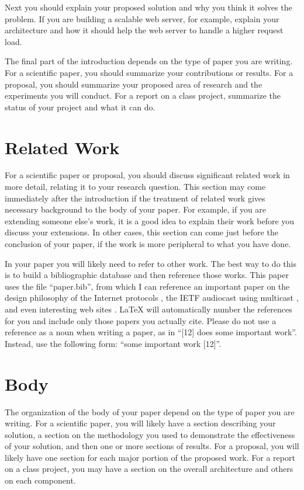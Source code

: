 \documentclass[11pt,onecolumn]{IEEEtran}
\begin{document}
Next you should explain your proposed solution and why you think it
solves the problem.  If you are building a scalable web server, for
example, explain your architecture and how it should help the
web server to handle a higher request load.

The final part of the introduction depends on the type of paper you
are writing.  For a scientific paper, you should summarize your
contributions or results.  For a proposal, you should summarize
your proposed area of research and the experiments you will conduct.
For a report on a class project, summarize the status of your project
and what it can do.

\section{Related Work}

For a scientific paper or proposal, you should discuss significant related
work in more detail, relating it to your research question.  This section
may come immediately after the introduction if the treatment of related
work gives necessary background to the body of your paper.  For example,
if you are extending someone else's work, it is a good idea to explain
their work before you discuss your extensions.  In other cases, this section
can come just before the conclusion of your paper, if the work is more
peripheral to what you have done.

In your paper you will likely need to refer to other work.  The best
way to do this is to build a bibliographic database and then reference
those works.  This paper uses the file ``paper.bib'', from which I can
reference an important paper on the design philosophy of the Internet
protocols \cite{internetdesign}, the IETF audiocast using multicast
\cite{mbone}, and even interesting web sites \cite{slashdot}.  LaTeX
will automatically number the references for you and include only
those papers you actually cite.  Please do not use a reference as a
noun when writing a paper, as in ``[12] does some important work''.
Instead, use the following form: ``some important work [12]''.

\section{Body}

The organization of the body of your paper depend on the type of paper
you are writing.  For a scientific paper, you will likely have a
section describing your solution, a section on the methodology you
used to demonstrate the effectiveness of your solution, and then one
or more sections of results.  For a proposal, you will likely have one
section for each major portion of the proposed work.  For a report on
a class project, you may have a section on the overall architecture and
others on each component.
\end{document}
